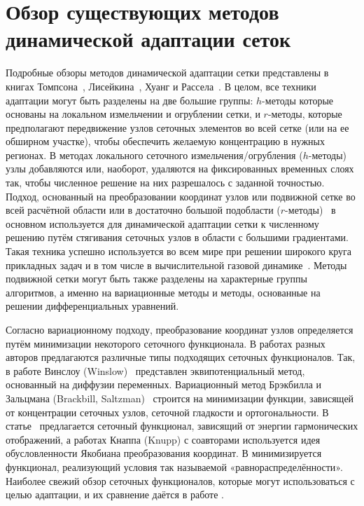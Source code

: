 \chapter{Обзор существующих методов динамической адаптации сеток} \label{ch:ch1}

Подробные обзоры методов динамической адаптации сетки представлены в книгах Томпсона~\cite{thompson_handbook_1998}, Лисейкина~\cite{liseikin2009grid}, Хуанг и Рассела~\cite{huang_adaptive_2011}. В целом, все техники адаптации могут быть разделены на две большие группы: $h$-методы которые основаны на локальном измельчении и огрублении сетки, и $r$-методы, которые предполагают передвижение узлов сеточных элементов во всей сетке (или на ее обширном участке), чтобы обеспечить желаемую концентрацию в нужных регионах. В методах локального сеточного измельчения/огрубления ($h$-методы)~\cite{adjerid_high-order_1992,eriksson_adaptive_1991,babuska_p-and_1990} узлы добавляются или, наоборот, удаляются на фиксированных временных слоях так, чтобы численное решение на них разрешалось с заданной точностью. Подход, основанный на преобразовании координат узлов или подвижной сетке во всей расчётной области или в достаточно большой подобласти ($r$-методы)~\cite{huang_adaptive_2011} в основном используется для динамической адаптации сетки к численному решению путём стягивания сеточных узлов в области с большими градиентами. Такая техника успешно используется во всем мире при решении широкого круга прикладных задач и в том числе в вычислительной газовой динамике~\cite{baker_mesh_1997,breslavskii_dynamic_2008,yanenko_methods_1976}. 
Методы подвижной сетки могут быть также разделены на характерные группы алгоритмов, а именно на вариационные методы и методы, основанные на решении дифференциальных уравнений.

	Согласно вариационному подходу, преобразование координат узлов определяется путём минимизации некоторого сеточного функционала. В работах разных авторов предлагаются различные типы подходящих сеточных функционалов. Так, в работе Винслоу (Winslow)~\cite{winslow_adaptive-mesh_1981} представлен эквипотенциальный метод, основанный на диффузии переменных. Вариационный метод Брэкбилла и Зальцмана (Brackbill, Saltzman)~\cite{brackbill_adaptive_1982}  строится на минимизации функции, зависящей от концентрации сеточных узлов, сеточной гладкости и ортогональности. В статье~\cite{dvinsky_adaptive_1991}  предлагается сеточный функционал, зависящий от энергии гармонических отображений, а работах Кнаппа (Knupp) с соавторами \cite{knupp_jacobian-weighted_1996, knupp_framework_2000}  используется идея обусловленности Якобиана преобразования координат. В \cite{huang_variational_2001}  минимизируется функционал, реализующий условия так называемой «равнораспределённости». Наиболее свежий обзор сеточных функционалов, которые могут использоваться с целью адаптации, и их сравнение даётся в работе \cite{huang_comparative_2015}.
	
